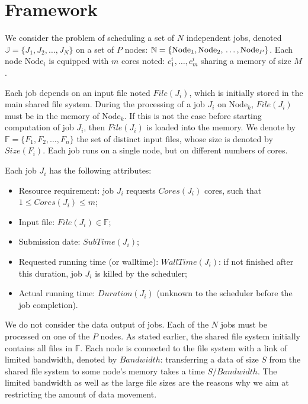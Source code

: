 \documentclass[sigconf,review,anonymous]{acmart}
\newcommand{\Node}[1]{\ensuremath{\mathrm{Node}_{#1}}\xspace}
\newcommand{\file}{\ensuremath{\mathit{File}}\xspace}
\newcommand{\size}{\ensuremath{\mathit{Size}}\xspace}
\newcommand{\memory}{\ensuremath{\mathit{M}}\xspace}
\newcommand{\duration}{\mathit{Duration}\xspace}
\newcommand{\bandwidth}{\mathit{Bandwidth}\xspace}
\newcommand{\core}{\mathit{Cores}\xspace}
\newcommand{\submissiontime}{\mathit{SubTime}\xspace}
\newcommand{\walltime}{\mathit{WallTime}\xspace}
\newcommand{\fileset}{\ensuremath{\mathbb{F}}\xspace}
\newcommand{\jobset}{\ensuremath{\mathbb{J}}\xspace}
\newcommand{\nodeset}{\ensuremath{\mathbb{N}}\xspace}
\begin{document}
\section{Framework}\label{sec.framework}

We consider the problem of scheduling a set of $N$ independent jobs,
denoted $\jobset = \{J_1, J_2, \ldots, J_N\}$ on a set of $P$ nodes:
$\nodeset = \{\Node{1}, \Node{2}, \\ \ldots, \Node{P}\}$.
Each node $\Node{i}$ is equipped with $m$ cores noted:
$c^i_1,\ldots,c^i_m$ sharing a memory of size $\memory$.

Each job depends on an input file noted $\file(J_i)$, which is
initially stored in the main shared file system.  During the
processing of a job $J_i$ on $\Node{k}$, $\file(J_i)$ must be in
the memory of $\Node{k}$. If this is not the case before starting
computation of job $J_i$, then $\file(J_i)$ is loaded into the
memory.  We denote by $\fileset = \{F_1, F_2, \ldots, F_n\}$ the set
of distinct input files, whose size is denoted by $\size(F_i)$. Each
job runs on a single node, but on different numbers of cores.



Each job $J_i$ has the following attributes:
\begin{itemize}
\item Resource requirement: job $J_i$ requests $\core(J_i)$  cores, such that $1 \leq \core(J_i) \leq m$;
\item Input file: $\file(J_i) \in \fileset$;
\item Submission date: $\submissiontime(J_i)$;
\item Requested running time (or walltime): $\walltime(J_i)$: if not
  finished after this duration, job $J_i$ is killed by the scheduler;
\item Actual running time: $\duration(J_i)$ (unknown to  the scheduler
  before the job completion).
\end{itemize}

We do not consider the data output of jobs.
Each of the $N$ jobs must be processed on one of the $P$ nodes.  As
stated earlier, the shared file system initially contains all files
in $\fileset$.  Each node is connected to the file system with a link
of limited bandwidth, denoted by $\bandwidth$: transferring a data of
size $S$ from the shared file system to some node's memory takes a
time $S/\bandwidth$.
The limited bandwidth
as well as the large file sizes are the reasons why we aim at
restricting the amount of data movement.
\end{document}
